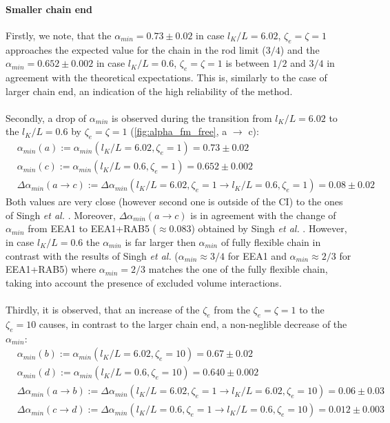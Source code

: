 \documentclass[
    paper=A4,pagesize=automedia,fontsize=12pt,
    BCOR=15mm,DIV=22,
    twoside,headinclude,footinclude=false,
    fleqn,             %
    bibliography=totocnumbered,          %
    listof=totoc,                %
    listof=flat,                 %
    cleardoublepage=empty      %
    numbers=endperiod
]{scrartcl}
\begin{document}
\paragraph{Smaller chain end}
Firstly, we note, that the $\alpha_{min} = 0.73 \pm 0.02$
in case $l_K/L=6.02$, $\zeta_e=\zeta=1$ approaches the expected value for 
the chain in the rod limit ($3/4$) and the $\alpha_{min} = 0.652 \pm 0.002$ in case
$l_K/L=0.6$, $\zeta_e=\zeta=1$ is between $1/2$ and $3/4$ in agreement with the 
theoretical expectations. This is, similarly to the case of larger chain end, 
an indication of the high reliability of the method.
\\
\\
Secondly, a drop of $\alpha_{min}$ is observed during the transition from $l_K/L=6.02$ to the $l_K/L=0.6$ by $\zeta_e=\zeta=1$ 
(\autoref{fig:alpha_fm_free}, a $\rightarrow$ c):
\begin{equation} \label{eq:alpha_min_l_p_trans}
    \begin{aligned}
        & \alpha_{min}(a):= \alpha_{min}(l_K/L=6.02,\zeta_e=1) = 0.73\pm0.02 \\
        & \alpha_{min}(c):= \alpha_{min}(l_K/L=0.6,\zeta_e=1) = 0.652 \pm 0.002 \\
        & \Delta \alpha_{min} (a \rightarrow c) := \Delta \alpha_{min}(l_K/L=6.02,\zeta_e=1 \rightarrow l_K/L=0.6,\zeta_e=1) = 0.08 \pm 0.02
    \end{aligned}
\end{equation}  
Both values are very close 
(however second one is outside of the CI) to the ones
of Singh \emph{et al.} \cite{Singh:2022}. Moreover, $\Delta \alpha_{min} (a \rightarrow c)$
is in agreement with the change of $\alpha_{min}$ from EEA1 to EEA1+RAB5 ($\approx 0.083$)
obtained by Singh \emph{et al.} \cite{Singh:2022}.
However, in case $l_K/L=0.6$ the $\alpha_{min}$ is
far larger then $\alpha_{min}$ of fully flexible chain in contrast with the results
of Singh \emph{et al.} \cite{Singh:2022} ($\alpha_{min} \approx 3/4$ for EEA1 and 
$\alpha_{min} \approx 2/3$ for EEA1+RAB5) 
where $\alpha_{min}=2/3$ matches 
the one of the fully flexible chain, taking into account the presence of 
excluded volume interactions.
\\
\\
Thirdly, it is observed, that an
increase of the $\zeta_e$ from the $\zeta_e=\zeta=1$ to the $\zeta_e=10$ causes, in contrast
to the larger chain end, a non-neglible decrease of the $\alpha_{min}$:
\begin{equation}
    \begin{aligned} \label{eq:alpha_min_zeta_e_trans}
        & \alpha_{min}(b) := \alpha_{min}(l_K/L=6.02, \zeta_e=10) = 0.67 \pm 0.02 \\
        & \alpha_{min}(d) := \alpha_{min}(l_K/L=0.6, \zeta_e=10) = 0.640 \pm 0.002 \\
        & \Delta \alpha_{min}(a \rightarrow b) := \Delta \alpha_{min}(l_K/L=6.02,\zeta_e=1 \rightarrow l_K/L=6.02,\zeta_e=10) = 0.06\pm0.03\\
        & \Delta \alpha_{min}(c \rightarrow d) := \Delta \alpha_{min}(l_K/L=0.6,\zeta_e=1 \rightarrow l_K/L=0.6,\zeta_e=10) = 0.012\pm0.003
    \end{aligned}
\end{equation}
\end{document}
